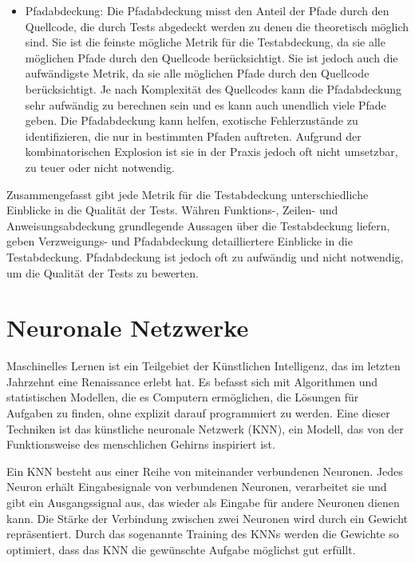 \begin{itemize}
    \item
    Pfadabdeckung: Die Pfadabdeckung misst den Anteil der Pfade durch den Quellcode, die durch Tests abgedeckt werden zu denen die theoretisch möglich sind.
    Sie ist die feinste mögliche Metrik für die Testabdeckung, da sie alle möglichen Pfade durch den Quellcode berücksichtigt.
    Sie ist jedoch auch die aufwändigste Metrik, da sie alle möglichen Pfade durch den Quellcode berücksichtigt.
    Je nach Komplexität des Quellcodes kann die Pfadabdeckung sehr aufwändig zu berechnen sein und es kann auch unendlich viele Pfade geben.
    Die Pfadabdeckung kann helfen, exotische Fehlerzustände zu identifizieren, die nur in bestimmten Pfaden auftreten.
    Aufgrund der kombinatorischen Explosion ist sie in der Praxis jedoch oft nicht umsetzbar, zu teuer oder nicht notwendig.

\end{itemize}

Zusammengefasst gibt jede Metrik für die Testabdeckung unterschiedliche Einblicke in die Qualität der Tests.
Währen Funktions-, Zeilen- und Anweisungsabdeckung grundlegende Aussagen über die Testabdeckung liefern, geben Verzweigungs- und Pfadabdeckung detailliertere Einblicke in die Testabdeckung.
Pfadabdeckung ist jedoch oft zu aufwändig und nicht notwendig, um die Qualität der Tests zu bewerten.

\section{Neuronale Netzwerke}
\label{subsec:Foundations:NeuralNetworks}

Maschinelles Lernen ist ein Teilgebiet der Künstlichen Intelligenz, das im letzten Jahrzehnt eine Renaissance erlebt hat.
Es befasst sich mit Algorithmen und statistischen Modellen, die es Computern ermöglichen, die Lösungen für Aufgaben zu finden, ohne explizit darauf programmiert zu werden.
Eine dieser Techniken ist das künstliche neuronale Netzwerk (KNN), ein Modell, das von der Funktionsweise des menschlichen Gehirns inspiriert ist.

Ein KNN besteht aus einer Reihe von miteinander verbundenen Neuronen.
Jedes Neuron erhält Eingabesignale von verbundenen Neuronen, verarbeitet sie und gibt ein Ausgangssignal aus, das wieder als Eingabe für andere Neuronen dienen kann.
Die Stärke der Verbindung zwischen zwei Neuronen wird durch ein Gewicht repräsentiert.
Durch das sogenannte Training des KNNs werden die Gewichte so optimiert, dass das KNN die gewünschte Aufgabe möglichst gut erfüllt.

